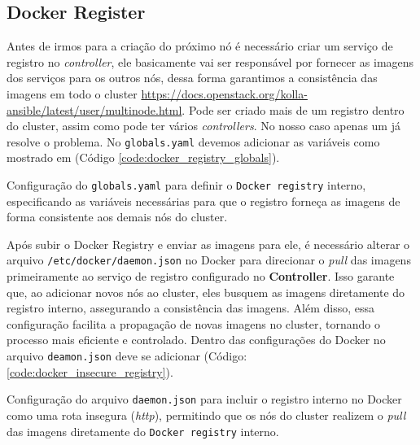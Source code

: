 \subsection{Docker Register}
Antes de irmos para a criação do próximo nó é necessário criar um serviço de registro no \textit{controller}, ele basicamente vai ser responsável por fornecer as imagens dos serviços para os outros nós, dessa forma garantimos a consistência das imagens em todo o cluster \url{https://docs.openstack.org/kolla-ansible/latest/user/multinode.html}. Pode ser criado mais de um registro dentro do cluster, assim como pode ter vários \textit{controllers}. No nosso caso apenas um já resolve o problema. No \texttt{globals.yaml} devemos adicionar as variáveis como mostrado em (Código \ref{code:docker_registry_globals}).

\begin{listing}[h!]
    \noindent{}  
  \caption{Configuração do \texttt{globals.yaml} para definir o \texttt{Docker registry} interno, especificando as variáveis necessárias para que o registro forneça as imagens de forma consistente aos demais nós do cluster.}
  \label{code:docker_registry_globals}
\end{listing}


Após subir o Docker Registry e enviar as imagens para ele, é necessário alterar o arquivo \texttt{/etc/docker/daemon.json} no Docker para direcionar o \textit{pull} das imagens primeiramente ao serviço de registro configurado no \textbf{Controller}. Isso garante que, ao adicionar novos nós ao cluster, eles busquem as imagens diretamente do registro interno, assegurando a consistência das imagens. Além disso, essa configuração facilita a propagação de novas imagens no cluster, tornando o processo mais eficiente e controlado. Dentro das configurações do Docker no arquivo \texttt{deamon.json} deve se adicionar (Código: \ref{code:docker_insecure_registry}).


\begin{listing}[h!]
    \noindent{}  
  \caption{Configuração do arquivo \texttt{daemon.json} para incluir o registro interno no Docker como uma rota insegura (\textit{http}), permitindo que os nós do cluster realizem o \textit{pull} das imagens diretamente do \texttt{Docker registry} interno.}
  \label{code:docker_insecure_registry}
\end{listing}


